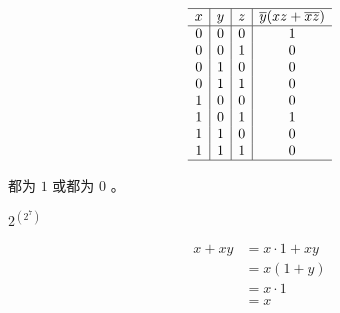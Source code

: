 {{\begin{practices}
\begin{enumerate}[A.]
{\begin{table}[H]
                        \[
                            \begin{array}{c|c|c|c}
                                \hline
                                x & y & z & \overline{y}(xz + \overline{x}\overline{z}) \\
                                \hline
                                0 & 0 & 0 & 1 \\
                                0 & 0 & 1 & 0 \\
                                0 & 1 & 0 & 0 \\
                                0 & 1 & 1 & 0 \\
                                1 & 0 & 0 & 0 \\
                                1 & 0 & 1 & 1 \\
                                1 & 1 & 0 & 0 \\
                                1 & 1 & 1 & 0 \\
                                \hline
                            \end{array}
                        \]
                    \end{table}
                }
            \end{enumerate}
        \end{practices}

        \begin{practices}
            
        \end{practices}

        \begin{practices}
            
        \end{practices}

        \begin{practices}
            都为 $1$ 或都为 $0$ 。
        \end{practices}

        \begin{practices}
            $2^{(2^7)}$
        \end{practices}

        \begin{practices}
            \begin{align*}
                x + xy
                &= x \cdot 1 + xy \\
                &= x(1 + y) \\
                &= x \cdot 1 \\
                &= x
            \end{align*}
        \end{practices}

}}

